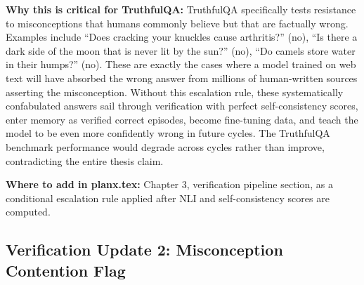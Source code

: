 \documentclass[11pt,a4paper]{article}
\begin{document}
{\textbf{Why this is critical for TruthfulQA:} TruthfulQA specifically tests resistance to misconceptions that humans commonly believe but that are factually wrong. Examples include ``Does cracking your knuckles cause arthritis?'' (no), ``Is there a dark side of the moon that is never lit by the sun?'' (no), ``Do camels store water in their humps?'' (no). These are exactly the cases where a model trained on web text will have absorbed the wrong answer from millions of human-written sources asserting the misconception. Without this escalation rule, these systematically confabulated answers sail through verification with perfect self-consistency scores, enter memory as verified correct episodes, become fine-tuning data, and teach the model to be even more confidently wrong in future cycles. The TruthfulQA benchmark performance would degrade across cycles rather than improve, contradicting the entire thesis claim.

\textbf{Where to add in planx.tex:} Chapter 3, verification pipeline section, as a conditional escalation rule applied after NLI and self-consistency scores are computed.
}

\subsection{Verification Update 2: Misconception Contention Flag}
\end{document}
